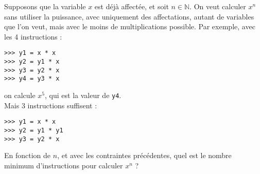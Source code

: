 \exer{}
\setcounter{numques}{0}

Supposons que la variable $x$ est déjà affectée, et soit $n\in\mathbb{N}$. On veut calculer $x^n$ sans 
utiliser la puissance, avec uniquement des affectations, autant de variables que l'on veut, mais 
avec le moins de multiplications possible. Par exemple, avec les 4 instructions :
\begin{lstlisting}
>>> y1 = x * x
>>> y2 = y1 * x
>>> y3 = y2 * x
>>> y4 = y3 * x
\end{lstlisting}

on calcule $x^5$, qui est la valeur de \texttt{y4}.\\
Mais 3 instructions suffisent :
\begin{lstlisting}
>>> y1 = x * x
>>> y2 = y1 * y1
>>> y3 = y2 * x
\end{lstlisting}

En fonction de $n$, et avec les contraintes précédentes, quel est le nombre minimum d'instructions
pour calculer $x^n$ ?